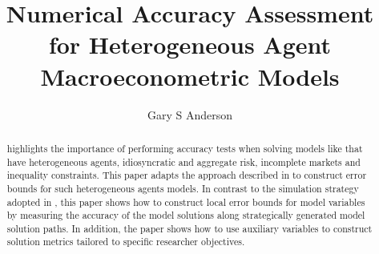 \documentclass[14pt]{article}
\author{Gary S Anderson}
\title{Numerical Accuracy Assessment for Heterogeneous Agent Macroeconometric Models}
\begin{document}
\maketitle

\begin{abstract}

  \cite{RePEc:eee:dyncon:v:34:y:2010:i:1:p:4-27} highlights the importance of
  performing
  accuracy tests when solving models like \cite{krusell98} that have
 heterogeneous agents, idiosyncratic and aggregate risk,
  incomplete markets and inequality constraints.
  This paper adapts the approach described in 
  \cite{RePEc:fip:fedgfe:2018-70}
to construct error bounds for such heterogeneous agents models.
In contrast to the simulation strategy adopted
in \cite{RePEc:eee:dyncon:v:34:y:2010:i:1:p:4-27}, this paper shows how to
construct local error bounds for model variables by measuring 
the accuracy of the model solutions along
strategically generated model solution paths.  In addition,
the paper shows how to
use auxiliary variables to construct solution metrics
 tailored to specific researcher objectives.

\end{abstract}




\end{document}
